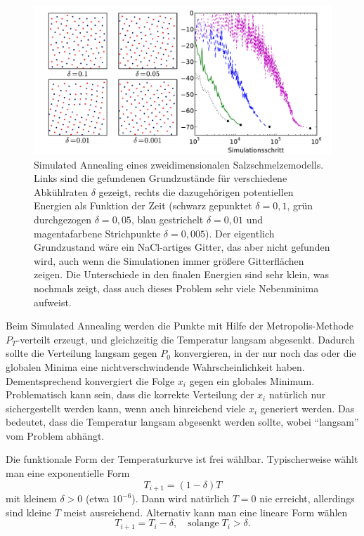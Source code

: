 \begin{figure}
  \centering
  \includegraphics[width=\textwidth]{plots/simulated_annealing}
  \caption{Simulated Annealing eines zweidimensionalen
    Salzschmelzemodells. Links sind die gefundenen Grundzustände für
    verschiedene Abkühlraten $\delta$ gezeigt, rechts die
    dazugehörigen potentiellen Energien als Funktion der Zeit (schwarz
    gepunktet $\delta=0,1$, grün durchgezogen $\delta=0,05$, blau
    gestrichelt $\delta=0,01$ und magentafarbene Strichpunkte
    $\delta=0,005$). Der eigentlich Grundzustand wäre ein
    NaCl-artiges Gitter, das aber nicht gefunden wird, auch wenn die
    Simulationen immer größere Gitterflächen zeigen. Die Unterschiede
    in den finalen Energien sind sehr klein, was nochmals zeigt,
    dass auch dieses Problem sehr viele Nebenminima aufweist.}
  \label{fig:simanneal}
\end{figure}

Beim Simulated Annealing werden die Punkte mit Hilfe der
Metropolis-Methode $P_T$-verteilt erzeugt, und gleichzeitig die
Temperatur langsam abgesenkt. Dadurch sollte die Verteilung langsam
gegen $P_0$ konvergieren, in der nur noch das oder die globalen Minima
eine nichtverschwindende Wahrscheinlichkeit haben. Dementsprechend
konvergiert die Folge $x_i$ gegen ein globales Minimum. Problematisch
kann sein, dass die korrekte Verteilung der $x_i$ natürlich nur
sichergestellt werden kann, wenn auch hinreichend viele $x_i$
generiert werden. Das bedeutet, dass die Temperatur langsam abgesenkt
werden sollte, wobei ``langsam'' vom Problem abhängt.

Die funktionale Form der Temperaturkurve ist frei
wählbar. Typischerweise wählt man eine exponentielle Form
\begin{equation}
  T_{i+1} = (1-\delta)T
\end{equation}
mit kleinem $\delta > 0$ (etwa $10^{-6}$). Dann wird natürlich $T=0$
nie erreicht, allerdings sind kleine $T$ meist ausreichend. Alternativ
kann man eine lineare Form wählen
\begin{equation}
  T_{i+1} = T_i - \delta,\quad\text{solange}\; T_i>\delta.
\end{equation}

